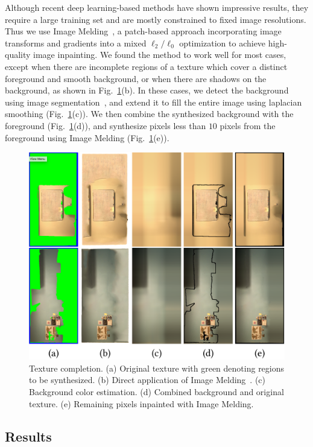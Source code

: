 Although recent deep learning-based methods have shown impressive results, they require a large training set and are mostly constrained to fixed image resolutions. 
Thus we use Image Melding~\cite{darabi2012image}, a patch-based approach incorporating image transforms and gradients into a mixed $\ell_2/\ell_0$ optimization to achieve high-quality image inpainting.
We found the method to work well for most cases, except when there are incomplete regions of a texture which cover a distinct foreground and smooth background, or when there are shadows on the background, as shown in Fig.~\ref{fig:3dlite-synthesize}(b).
In these cases, we detect the background using image segmentation~\cite{felzenszwalb2004efficient}, and extend it to fill the entire image using laplacian smoothing (Fig.~\ref{fig:3dlite-synthesize}(c)).
We then combine the synthesized background with the foreground (Fig.~\ref{fig:3dlite-synthesize}(d)), and synthesize pixels less than $10$ pixels from the foreground using Image Melding (Fig.~\ref{fig:3dlite-synthesize}(e)).

\begin{figure}
    \centering
    \includegraphics[width=0.8\linewidth]{3dlite/fig10.png}
    \caption{Texture completion. (a) Original texture with green denoting regions to be synthesized. (b) Direct application of Image Melding~\cite{darabi2012image}. (c) Background color estimation. (d) Combined background and original texture. (e) Remaining pixels inpainted with Image Melding.}
    \label{fig:3dlite-synthesize}
\end{figure}

\subsection{Results}
\label{sec:results}

